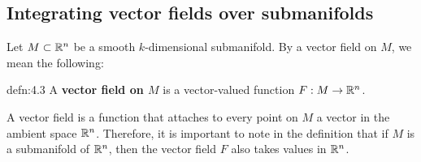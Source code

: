 \subsection{Integrating vector fields over submanifolds} \label{subsec:4.2}
Let $M \subset \mathbb{R}^n$ be a smooth $k$-dimensional submanifold. By a 
vector field on $M$, we mean the following: 

\begin{defn}{defn:4.3}
    A {\bf vector field on $M$} is a vector-valued function $F : M \to \mathbb{R}^n$. 
\end{defn}\vspace{-0.25cm}

A vector field is a function that attaches to every point on $M$ 
a vector in the ambient space $\mathbb{R}^n$. Therefore, it is important 
to note in the definition that if $M$ is a submanifold of $\mathbb{R}^n$, then the 
vector field $F$ also takes values in $\mathbb{R}^n$. 

